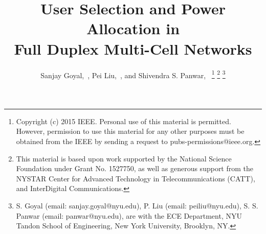 \documentclass[journal]{IEEEtran}
\newif\ifconf
\begin{document}
\title{User Selection and Power Allocation in \\ Full Duplex Multi-Cell Networks}

\ifconf
    \author{\IEEEauthorblockN{Sanjay Goyal,
    Pei Liu,
    Shivendra S. Panwar} \\
    \IEEEauthorblockA{Department of Electrical and Computer Engineering\\
     NYU Tandon School of Engineering,
    Brooklyn, New York 11201\\ Email:\{sanjay.goyal,peiliu,panwar\}@nyu.edu}
}

\else
    \author{
        Sanjay Goyal,~,
        Pei Liu,~,
        and Shivendra S. Panwar,~
        \thanks{Copyright (c) 2015 IEEE. Personal use of this material is permitted. However, permission to use this material for any other purposes must be obtained from the IEEE by sending a request to pubs-permissions@ieee.org.}
        \thanks{This material is based upon work supported by the National Science Foundation under Grant No. 1527750, as well as generous support from the NYSTAR Center for Advanced Technology in Telecommunications (CATT), and InterDigital Communications.}
        \thanks{
            S. Goyal (email: sanjay.goyal@nyu.edu),
            P. Liu (email: peiliu@nyu.edu),
            S. S. Panwar (email: panwar@nyu.edu),
            are with the ECE Department, NYU Tandon School of Engineering,
            New York University, Brooklyn, NY.}
    }
\fi


\maketitle
\end{document}
